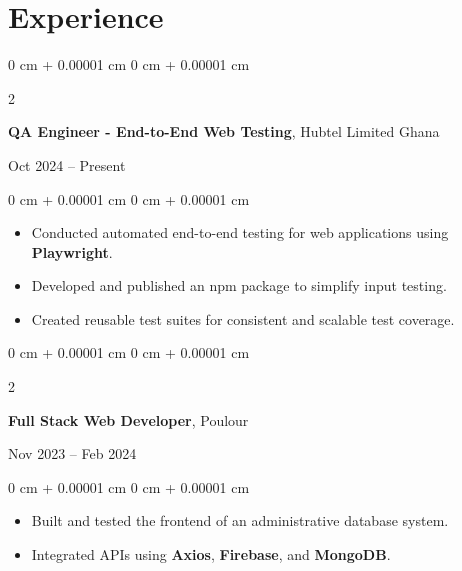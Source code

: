 \documentclass[10pt, letterpaper]{article}
\newenvironment{highlights}{
    \begin{itemize}[
        topsep=0.10 cm,
        parsep=0.10 cm,
        partopsep=0pt,
        itemsep=0pt,
        leftmargin=0 cm + 10pt
    ]
}{
    \end{itemize}
} %
\newenvironment{onecolentry}{
    \begin{adjustwidth}{
        0 cm + 0.00001 cm
    }{
        0 cm + 0.00001 cm
    }
}{
    \end{adjustwidth}
} %
\newenvironment{twocolentry}[2][]{
    \onecolentry
    \def\secondColumn{#2}
    \setcolumnwidth{\fill, 4.5 cm}
    \begin{paracol}{2}
}{
    \switchcolumn \raggedleft \secondColumn
    \end{paracol}
    \endonecolentry
} %
\begin{document}





\section{Experience}

\begin{twocolentry}{Oct 2024 – Present}
    \textbf{QA Engineer - End-to-End Web Testing}, Hubtel Limited Ghana
\end{twocolentry}

\vspace{0.10 cm}
\begin{onecolentry}
    \begin{highlights}
        \item Conducted automated end-to-end testing for web applications using
        \textbf{Playwright}.
        \item Developed and published an npm package to simplify input testing.
        \item Created reusable test suites for consistent and scalable test coverage.
    \end{highlights}
\end{onecolentry}

\vspace{0.30 cm}

\begin{twocolentry}{Nov 2023 – Feb 2024}
    \textbf{Full Stack Web Developer}, Poulour
\end{twocolentry}

\vspace{0.10 cm}
\begin{onecolentry}
    \begin{highlights}
        \item Built and tested the frontend of an administrative database system.
        \item Integrated APIs using \textbf{Axios}, \textbf{Firebase}, and \textbf{MongoDB}.
    \end{highlights}
\end{onecolentry}
\end{document}
